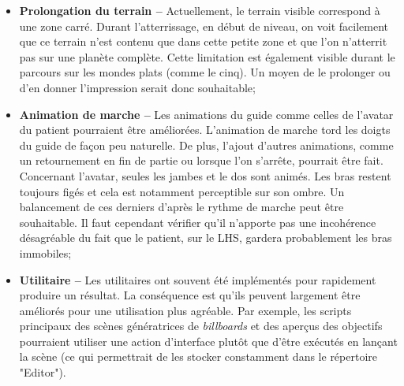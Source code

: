 \begin{itemize}
			\item \textbf{Prolongation du terrain --} Actuellement, le terrain visible correspond à une zone carré. Durant l'atterrissage, en début de niveau, on voit facilement que ce terrain n'est contenu que dans cette petite zone et que l'on n'atterrit pas sur une planète complète. Cette limitation est également visible durant le parcours sur les mondes plats (comme le cinq). Un moyen de le prolonger ou d'en donner l'impression serait donc souhaitable;
			
			\item \textbf{Animation de marche --} Les animations du guide comme celles de l'avatar du patient pourraient être améliorées. L'animation de marche tord les doigts du guide de façon peu naturelle. De plus, l'ajout d'autres animations, comme un retournement en fin de partie ou lorsque l'on s'arrête, pourrait être fait. Concernant l'avatar, seules les jambes et le dos sont animés. Les bras restent toujours figés et cela est notamment perceptible sur son ombre. Un balancement de ces derniers d'après le rythme de marche peut être souhaitable. Il faut cependant vérifier qu'il n'apporte pas une incohérence désagréable du fait que le patient, sur le LHS, gardera probablement les bras immobiles;
			
			\item \textbf{Utilitaire --} Les utilitaires ont souvent été implémentés pour rapidement produire un résultat. La conséquence est qu'ils peuvent largement être améliorés pour une utilisation plus agréable. Par exemple, les scripts principaux des scènes génératrices de \textit{billboards} et des aperçus des objectifs pourraient utiliser une action d'interface plutôt que d'être exécutés en lançant la scène (ce qui permettrait de les stocker constamment dans le répertoire "Editor").
		\end{itemize}	
		
	
